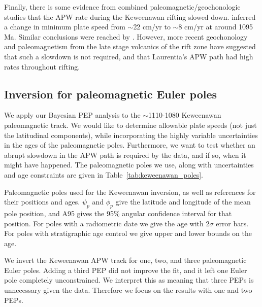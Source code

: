 \documentclass[preprint,12pt,authoryear]{elsarticle}
\begin{document}
Finally, there is some evidence from combined paleomagnetic/geochonologic studies that
the APW rate during the Keweenawan rifting slowed down.
\citet{davis1997geochronology} inferred a change in minimum plate speed from $\sim$22 cm/yr
to $\sim$8 cm/yr at around 1095 Ma. Similar conclusions were reached by \citet{swanson2009no}.
However, more recent geochonology and paleomagnetism from the late stage volcanics
of the rift zone \citep{fairchild2016end} have suggested that such a
slowdown is not required, and that Laurentia's APW path had high rates throughout rifting.

\subsection{Inversion for paleomagnetic Euler poles}

We apply our Bayesian PEP analysis to the $\sim$1110-1080 Keweenawan paleomagnetic track.
We would like to determine allowable plate speeds (not just the latitudinal components), while
incorporating the highly variable uncertainties in the ages of the paleomagnetic poles.
Furthermore, we want to test whether an abrupt slowdown in the APW path is required by the data,
and if so, when it might have happened.
The paleomagnetic poles we use, along with uncertainties and age constraints are given in Table~\ref{tab:keweenawan_poles}.

\begin{landscape}
\begin{table}
\scriptsize

\caption[Paleomagnetic poles used for the Keweenawan inversion.]{Paleomagnetic poles used for the Keweenawan inversion, as well as references for their positions and ages. 
$\psi_p$ and $\phi_p$ give the latitude and longitude of the mean pole position, and A95 gives the 95\% angular confidence interval for that position.
For poles with a radiometric date we give the age with 2$\sigma$ error bars.
For poles with stratigraphic age control we give upper and lower bounds on the age.}
\label{tab:keweenawan_poles}
\end{table}
\end{landscape}

We invert the Keweenawan APW track for one, two, and three paleomagnetic Euler poles.
Adding a third PEP did not improve the fit, and it left one Euler pole completely unconstrained.
We interpret this as meaning that three PEPs is unnecessary given the data. Therefore we focus
on the results with one and two PEPs.
\end{document}
